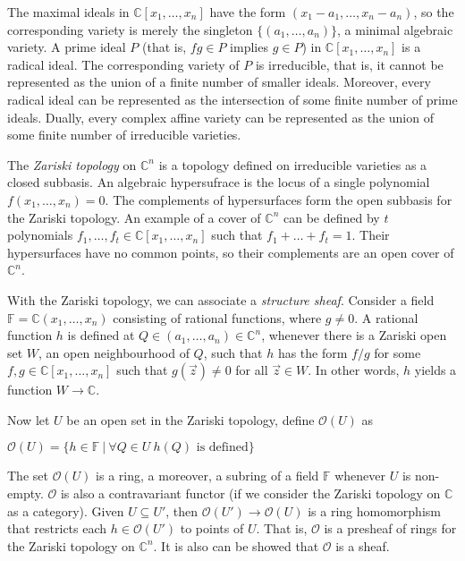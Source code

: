 \documentclass[a4paper]{article}
\theoremstyle{defin}
\theoremstyle{theorem}
\theoremstyle{claim}
\theoremstyle{prop}
\theoremstyle{lemma}
\theoremstyle{fact}
\theoremstyle{ex}
\theoremstyle{col}
\begin{document}
The maximal ideals in $\mathbb{C}[x_1, \dots, x_n]$ have the form $(x_1 - a_1, \dots, x_n - a_n)$, so the corresponding variety is merely the singleton $\{ (a_1, \dots, a_n) \}$, a minimal algebraic variety. A prime ideal $P$ (that is, $fg \in P$ implies $g \in P$) in $\mathbb{C}[x_1, \dots, x_n]$ is a radical ideal. The corresponding variety of $P$ is irreducible, that is, it cannot be represented as the union of a finite number of smaller ideals. Moreover, every radical ideal can be represented as the intersection of some finite number of prime ideals. Dually, every complex affine variety can be represented as the union of some finite number of irreducible varieties.

The \emph{Zariski topology} on $\mathbb{C}^n$ is a topology defined on irreducible varieties as a closed subbasis. An algebraic hypersufrace is the locus of a single polynomial $f(x_1, \dots, x_n) = 0$. The complements of hypersurfaces form the open subbasis for the Zariski topology. An example of a cover of $\mathbb{C}^n$ can be defined by $t$ polynomials $f_1, \dots, f_t \in \mathbb{C}[x_1, \dots, x_n]$ such that $f_1 + \dots + f_t = 1$. Their hypersurfaces have no common points, so their complements are an open cover of $\mathbb{C}^n$.

With the Zariski topology, we can associate a \emph{structure sheaf}. Consider a field $\mathbb{F} = \mathbb{C}(x_1, \dots, x_n)$ consisting of rational functions, where $g \neq 0$. A rational function $h$ is defined at $Q \in (a_1, \dots, a_n) \in \mathbb{C}^n$, whenever there is a Zariski open set $W$, an open neighbourhood of $Q$, such that $h$ has the form $f/g$ for some $f, g \in \mathbb{C}[x_1, \dots, x_n]$ such that $g(\vec{z}) \neq 0$ for all $\vec{z} \in W$. In other words, $h$ yields a function $W \to \mathbb{C}$.

Now let $U$ be an open set in the Zariski topology, define $\mathcal{O}(U)$ as
\begin{center}
$\mathcal{O}(U) = \{ h \in \mathbb{F} \: | \: \forall Q \in U \: \text{$h(Q)$ is defined} \}$
\end{center}
The set $\mathcal{O}(U)$ is a ring, a moreover, a subring of a field $\mathbb{F}$ whenever $U$ is non-empty. $\mathcal{O}$ is also a contravariant functor (if we consider the Zariski topology on $\mathbb{C}$ as a category). Given $U \subseteq U'$, then $\mathcal{O}(U') \to \mathcal{O}(U)$ is a ring homomorphism that restricts each $h \in \mathcal{O}(U')$ to points of $U$. That is, $\mathcal{O}$ is a presheaf of rings for the Zariski topology on $\mathbb{C}^n$. It is also can be showed that $\mathcal{O}$ is a sheaf.
\end{document}
